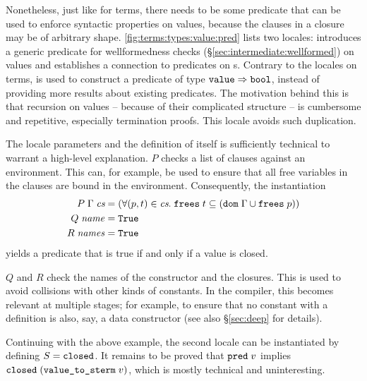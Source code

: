 Nonetheless, just like for terms, there needs to be some predicate that can be used to enforce syntactic properties on values, because the clauses in a closure may be of arbitrary shape.
\cref{fig:terms:types:value:pred} lists two locales:
 introduces a generic predicate  for wellformedness checks (§\ref{sec:intermediate:wellformed}) on values and  establishes a connection to predicates on s.
Contrary to the locales on terms,  is used to construct a predicate of type $\texttt{\textup{value}} \Rightarrow \texttt{\textup{bool}}$, instead of providing more results about existing predicates.
The motivation behind this is that recursion on values -- because of their complicated structure -- is cumbersome and repetitive, especially termination proofs.
This locale avoids such duplication.

The locale parameters and the definition of  itself is sufficiently technical to warrant a high-level explanation.
$P$ checks a list of clauses against an environment.
This can, for example, be used to ensure that all free variables in the clauses are bound in the environment.
Consequently, the instantiation
%
\begin{align*}
  P\;\Gamma\;\textit{cs} &= (\forall (p, t)\in\textit{cs}.\;\texttt{\textup{frees}}\;t \subseteq (\texttt{\textup{dom}}\;\Gamma \cup \texttt{\textup{frees}}\; p)) \\
  Q\;\mathit{name} &= \texttt{\textup{True}} \\
  R\;\mathit{names} &= \texttt{\textup{True}}
\end{align*}
%
yields a predicate that is true if and only if a value is closed.

$Q$ and $R$ check the names of the constructor and the closures.
This is used to avoid collisions with other kinds of constants.
In the compiler, this becomes relevant at multiple stages; for example, to ensure that no constant with a definition is also, say, a data constructor (see also §\ref{sec:deep} for details).


\noindent
Continuing with the above example, the second locale  can be instantiated by defining $S = \texttt{\textup{closed}}$.
It remains to be proved that $\texttt{\textup{pred}}\;v$ implies $\texttt{\textup{closed}}\;(\texttt{\textup{value\_to\_sterm}}\allowbreak\;v)$, which is mostly technical and uninteresting.

